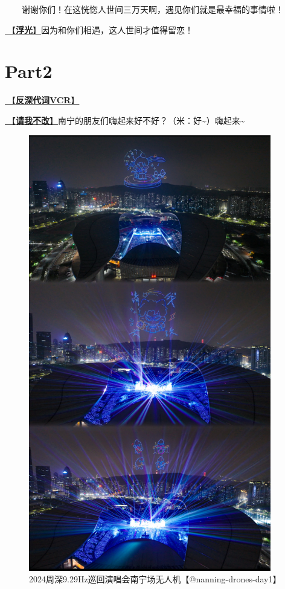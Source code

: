 \documentclass[]{ctexbook}
\begin{document}
  谢谢你们！在这恍惚人世间三万天啊，遇见你们就是最幸福的事情啦！

\hyperref[floating-light]{🎵【\textbf{浮光}】}因为和你们相遇，这人世间才值得留恋！

\section{Part2}\label{nanning-20241206-part2}

\hyperref[senself-vcr]{🎥【\textbf{反深代词VCR}】}

\hyperref[brave-heart]{🎵【\textbf{请我不改}】}南宁的朋友们嗨起来好不好？（米：好\textasciitilde）嗨起来\textasciitilde{}

\begin{figure}

{\centering \includegraphics[width=300pt]{img/nanning20241206/001} 

}

\caption{2024周深9.29Hz巡回演唱会南宁场无人机【@nanning-drones-day1】}\label{fig:unnamed-chunk-129}
\end{figure}
\end{document}
